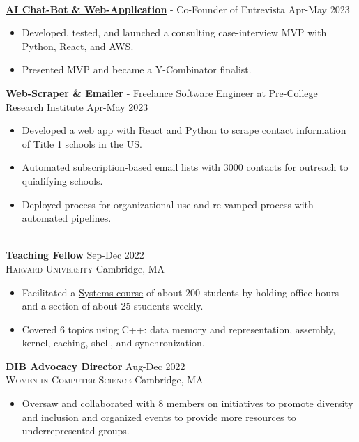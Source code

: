\documentclass[11pt]{article}
\begin{document}
  \vspace{-8pt}\\
  \noindent\makebox[\linewidth]{\rule{7.5in}{0.3pt}}
    \noindent \href{https://interviewinsight.com}{\textbf{AI Chat-Bot \& Web-Application}} - Co-Founder of Entrevista \hfill Apr-May 2023
    \begin{itemize}[itemsep=-.4em, leftmargin=1em]\vspace{-2mm}
      \item Developed, tested, and launched a consulting case-interview MVP with Python, React, and AWS.
      \item Presented MVP and became a Y-Combinator finalist.
    \end{itemize}
    \noindent \href{https://alejandraprj.com/pcrisite}{\textbf{Web-Scraper \& Emailer}} - Freelance Software Engineer at Pre-College Research Institute \hfill Apr-May 2023
    \begin{itemize}[itemsep=-.4em, leftmargin=1em]\vspace{-2mm}
      \item Developed a web app with React and Python to scrape contact information of Title 1 schools in the US.
      \item Automated subscription-based email lists with 3000 contacts for outreach to quialifying schools.
      \item Deployed process for organizational use and re-vamped process with automated pipelines.
    \end{itemize}
  \vspace{.5mm}

  \vspace{-8pt}\\
  \noindent\makebox[\linewidth]{\rule{7.5in}{0.3pt}}
  \noindent\textbf{Teaching Fellow} \hfill Sep-Dec 2022 \\
  \textsc{Harvard University} \hfill Cambridge, MA
  \begin{itemize}[itemsep=-.4em, leftmargin=1em]\vspace{-2mm}
    \item Facilitated a \href{https://cs61.seas.harvard.edu/site/2022/#gsc.tab=0}{Systems course} of about 200 students by holding office hours and a section of about 25 students weekly.
    \item Covered 6 topics using C++: data memory and representation, assembly, kernel, caching, shell, and synchronization.
  \end{itemize}
  \noindent\textbf{DIB Advocacy Director} \hfill Aug-Dec 2022 \\
  \textsc{Women in Computer Science} \hfill Cambridge, MA
  \begin{itemize}[itemsep=-.4em, leftmargin=1em]\vspace{-2mm}
    \item Oversaw and collaborated with 8 members on initiatives to promote diversity and inclusion and organized events to provide more resources to underrepresented groups.
  \end{itemize}
  \vspace{.5mm}
\end{document}

